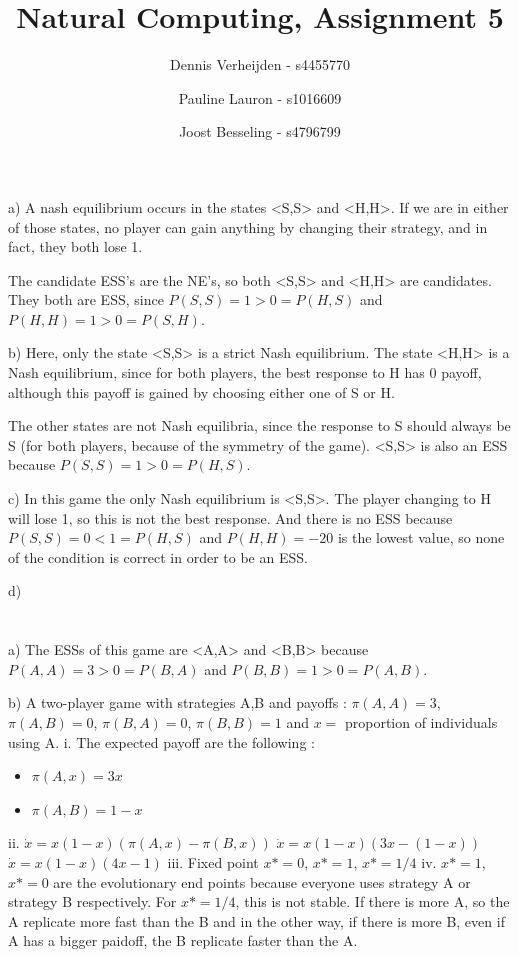 \documentclass[11pt]{article}
\title{Natural Computing, Assignment 5}
\author{Dennis Verheijden - s4455770 \and Pauline Lauron - s1016609 \and Joost Besseling - s4796799}
\begin{document}
\maketitle

\section{}
a) A nash equilibrium occurs in the states <S,S> and <H,H>. If we are in either of those states, no player can gain anything by changing their strategy, and in fact, they both lose 1.

The candidate ESS's are the NE's, so both <S,S> and <H,H> are candidates. They both are ESS, since $P(S,S) = 1 > 0 = P(H,S)$ and $P(H,H) = 1 > 0 = P(S,H)$.

b) Here, only the state <S,S> is a strict Nash equilibrium. The state <H,H> is a Nash equilibrium, since for both players, the best response to H has 0 payoff, although this payoff is gained by choosing either one of S or H. 

The other states are not Nash equilibria, since the response to S should always be S (for both players, because of the symmetry of the game). <S,S> is also an ESS because $P(S,S) = 1 > 0 = P(H,S)$.  

c) In this game the only Nash equilibrium is <S,S>. The player changing to H will lose 1, so this is not the best response. And there is no ESS because $P(S,S) = 0 <  1 = P(H,S)$ and $P(H,H) = -20$ is the lowest value, so none of the condition is correct in order to be an ESS. 

d) %




\section{}

a) The ESSs of this game are <A,A> and <B,B> because $P(A,A) = 3 > 0 = P(B,A)$ and $P(B,B) = 1 > 0 = P(A,B)$.

b) A two-player game with strategies A,B and payoffs :  $\pi(A,A) = 3 $, $\pi(A,B) = 0 $, $\pi(B, A) = 0 $, $\pi(B,B) = 1 $ and $x = $ proportion of individuals using A.  
\newline i. The expected payoff are the following : 
\begin{itemize}
	\item $\pi(A,x) = 3x $
	\item $\pi(A,B) = 1-x$
\end{itemize}
ii. $\dot{x} = x(1-x)(\pi(A,x)-\pi(B,x))$
$\dot{x} = x(1-x)(3x-(1-x))$
$\dot{x}= x(1-x)(4x-1)$
\newline iii. Fixed point $x* = 0$, $x* = 1$, $x* = 1/4$
\newline iv.  $x* = 1$, $x* = 0$ are the evolutionary end points because everyone uses strategy A or strategy B respectively. For  $x* = 1/4$, this is not stable. If there is more A, so the A replicate more fast than the B and in the other way, if there is more B, even if A has a bigger paidoff, the B replicate faster than the A.
\end{document}

